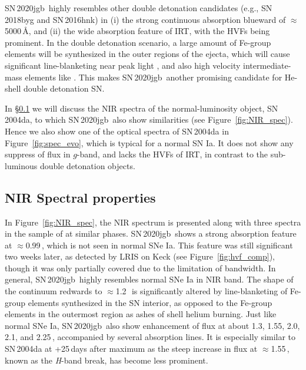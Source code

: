 \documentclass[twocolumn]{aastex631}
\newcommand\sn{SN\,2020jgb}
\begin{document}
\sn\ highly resembles other double detonation candidates (e.g., SN\,2018byg and SN\,2016hnk) in (i) the strong continuous absorption blueward of $\approx$5000\,\r{A}, and (ii) the wide absorption feature of  IRT, with the HVFs being prominent. In the double detonation scenario, a large amount of Fe-group elements will be synthesized in the outer regions of the ejecta, which will cause significant line-blanketing near peak light \citep{Kromer_DD_2010, polin_observational_2019}, and also high velocity intermediate-mass elements like  \citep{Fink_DD_2010, Kromer_DD_2010}. This makes \sn\ another promising candidate for He-shell double detonation SN.

In \S\ref{sec:NIR_spec} we will discuss the NIR spectra of the normal-luminosity object, SN\,2004da, to which \sn\ also show similarities (see Figure~\ref{fig:NIR_spec}). Hence we also show one of the optical spectra of SN\,2004da in Figure~\ref{fig:spec_evo}, which is typical for a normal SN Ia. It does not show any suppress of flux in $g$-band, and lacks the HVFs of  IRT, in contrast to the sub-luminous double detonation objects.

\subsection{NIR Spectral properties}
\label{sec:NIR_spec}
In Figure~\ref{fig:NIR_spec}, the NIR spectrum is presented along with three spectra in the sample of \cite{Marion2009_NIR} at similar phases. \sn\ shows a strong absorption feature at $\approx$0.99\,\micron, which is not seen in normal SNe Ia. This feature was still significant two weeks later, as detected by LRIS on Keck (see Figure~\ref{fig:hvf_comp}), though it was only partially covered due to the limitation of bandwidth. In general, \sn\ highly resembles normal SNe Ia in NIR band. The shape of the continuum redwards to $\approx$1.2\,\micron\ is significantly altered by line-blanketing of Fe-group elements synthesized in the SN interior, as opposed to the Fe-group elements in the outermost region as ashes of shell helium burning. Just like normal SNe Ia, \sn\ also show enhancement of flux at about 1.3, 1.55, 2.0, 2.1, and 2.25\,\micron, accompanied by several  absorption lines. It is especially similar to SN\,2004da at +25\,days after maximum as the steep increase in flux at $\approx$1.55\,\micron, known as the \textit H-band break, has become less prominent. %
\end{document}
